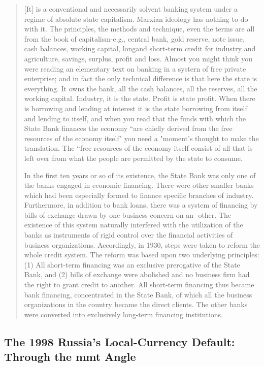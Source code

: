 \begin{quote}
[It] is a
conventional and necessarily solvent banking
system under a regime of absolute state capitalism. Marxian ideology has nothing to do
with it. The principles, the methods and technique, even the terms are all from the book of
capitalism-e.g., central bank, gold reserve,
note issue, cash balances, working capital, longand short-term credit for industry and agriculture, savings, surplus, profit and loss. Almost you might think you were reading an
elementary text on banking in a systern of free
private enterprise; and in fact the only technical difference is that here the state is
everything. It owns the bank, all the cash balances, all the reserves, all the working capital.
Industry, it is the state. Profit is state profit.
When there is borrowing and lending at interest it is the state borrowing from itself and
lending to itself, and when you read that the
funds with which the State Bank finances the
economy ``are chiefly derived from the free
resources of the economy itself" you need a
"moment's thought to make the translation.
The ``free resources of the economy itself consist of all that is left over from what the people are permitted by the state to consume.\par In the first ten years or so of its existence, the
State Bank was only one of the banks engaged in
economic financing. There were other smaller banks
which had been especially formed to finance specific
branches of industry. Furthermore, in addition to
bank loans, there was a system of financing by bills
of exchange drawn by one business concern on an-
other. The existence of this system naturally interfered with the utilization of the banks as instruments of rigid control over the financial activities
of business organizations.
Accordingly, in 1930, steps were taken to reform
the whole credit system. The reform was based
upon two underlying principles: (1) All short-term
financing was an exclusive prerogative of the State
Bank, and (2) bills of exchange were abolished and
no business firm had the right to grant credit to
another. All short-term financing thus became bank
financing, concentrated in the State Bank, of which
all the business organizations in the country became
the direct clients. The other banks were converted
into exclusively long-term financing institutions.~\citep{AA1946}
\end{quote}

\subsection{The 1998 Russia's Local-Currency Default: Through the \ac{mmt} Angle}

